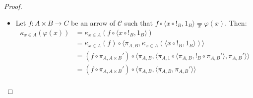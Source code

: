 \begin{proof}
\begin{itemize}
\begin{itemize}
\begin{align*}
            \end{align*}
            \item if $\varphi(x) = \psi(x)^*$, with $\psi(x) : B \times E \to D$ and $C = D^E$, then:
            \begin{align*}
                \kappa_{x \in A}(\psi(x)^*) \circ \langle x \circ !_B, 1_B\rangle &\underset{x}{=} (\kappa_{x \in A}\psi(x) \circ \alpha_{A,B,E})^* \circ \langle x \circ !_B, 1_B\rangle \\
                                                                                  &\underset{x}{=} (\kappa_{x \in A}\psi(x) \circ \alpha_{A,B,E} \circ (\langle x \circ !_B, 1_B\rangle \times 1_E))^* &&(\textnormal{by $\clubsuit$})\\
                                                                                  &\underset{x}{=} (\kappa_{x \in A}\psi(x) \circ \langle x \circ !_{B \times E}, 1_{B \times E}\rangle)^* &&(\textnormal{by $\heartsuit$})\\
                                                                                  &\underset{x}{=} \psi(x)^*,
            \end{align*}
            where $\clubsuit$ is the identity $f^* \circ g = (f \circ (g \times 1_E))^*$, for every $f : Y \times E \to D$ and $g : X \to Y$; $\heartsuit$ is the identity
            \[ \alpha_{A,B,E} \circ (\langle x \circ !_B, 1_B\rangle \times 1_E) = \langle x \circ !_{B \times E}, 1_{B \times E}\rangle, \]
            that can be proved using the definition of $\alpha_{A,B,E}$, and the last equality is by the inductive hypothesis.
        \end{itemize}
        \item[$\boxed{\textnormal{uniqueness}}$] Let $f : A \times B \to C$ be an arrow of $\mathcal C$ such that $f \circ \langle x \circ !_B, 1_B\rangle \underset{x}{=} \varphi(x)$. Then:
        \begin{align*}
            \kappa_{x \in A}(\varphi(x)) &= \kappa_{x \in A}(f \circ \langle x \circ !_B, 1_B\rangle) \\
                                         &= \kappa_{x \in A}(f) \circ \langle \pi_{A,B}, \kappa_{x \in A}(\langle x \circ !_B, 1_B\rangle)\rangle \\
                                         &= (f \circ \pi_{A,A \times B}') \circ \langle \pi_{A,B}, \langle \pi_{A,1} \circ \langle \pi_{A,B}, !_B \circ \pi_{A,B}'\rangle, \pi_{A,B}' \rangle \rangle \\
                                         &= (f \circ \pi_{A,A \times B}') \circ \langle \pi_{A,B}, \langle \pi_{A,B}, \pi_{A,B}' \rangle \rangle \\

\end{align*}
\end{itemize}
\end{proof}
